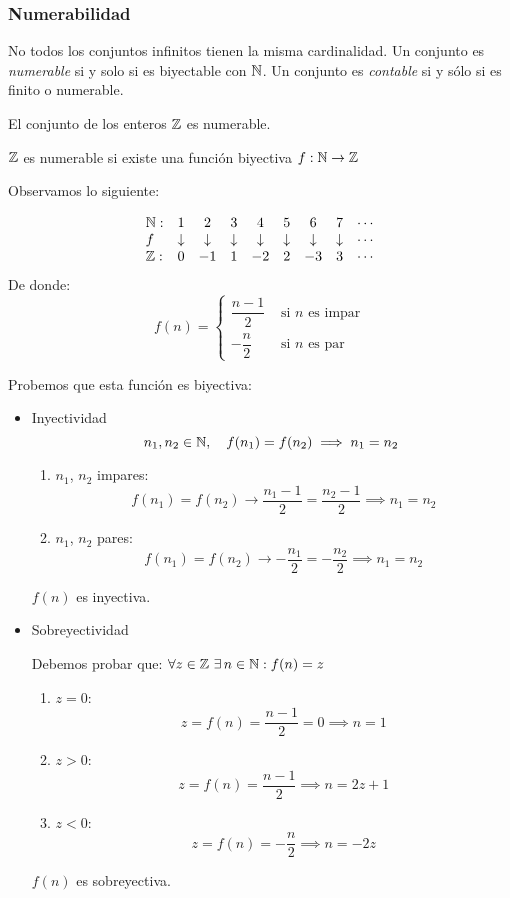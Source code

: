 \subsubsection{Numerabilidad}
No todos los conjuntos infinitos tienen la misma cardinalidad. Un conjunto es \textit{numerable} si y solo si es biyectable con $\mathbb{N}$. Un conjunto es \textit{contable} si y sólo si es finito o numerable.

\begin{fmd-theorem}[Numerabilidad de $\Z$]
	El conjunto de los enteros $\Z$ es numerable.
\end{fmd-theorem}

\begin{fmd-proof}
	$\Z$ es numerable si existe una función biyectiva $f: \mathbb{N} \rightarrow \mathbb{Z}$
	
	Observamos lo siguiente:
	
	\[ \begin{array}{lcccccccc}
		\mathbb{N}: & 1 & 2 & 3 & 4 & 5 & 6 & 7 & \cdots\\
		f & \downarrow & \downarrow & \downarrow & \downarrow & \downarrow & \downarrow & \downarrow & \cdots\\
		\mathbb{Z}: & 0 & -1 & 1 & -2 & 2 & -3 & 3 & \cdots
	\end{array} \]
	De donde:
	\[ f(n) = \begin{cases}
		\dfrac{n-1}{2} & \text{ si } n \text{ es impar}\\[3mm]
		- \dfrac{n}{2} & \text{ si } n \text{ es par}
	\end{cases} \]
	
	Probemos que esta función es biyectiva:
	
	\begin{itemize}
		\item Inyectividad
		\[ n_1, n_2 \in \mathbb{N}, \quad f(n_1) = f(n_2) \implies n_1 = n_2\]
		\begin{enumerate}[label=\arabic*)]
			\item $n_1$, $n_2$ impares:
			\[ f(n_1) = f(n_2) \rightarrow \dfrac{n_1 - 1}{2} = \dfrac{n_2 - 1}{2} \implies n_1 = n_2 \]
			\item $n_1$, $n_2$ pares:
			\[ f(n_1) = f(n_2) \rightarrow -\dfrac{n_1}{2} = -\dfrac{n_2}{2} \implies n_1 = n_2 \]
		\end{enumerate}
		$f(n)$ es inyectiva.
		
		\item Sobreyectividad
		
		Debemos probar que: \( \forall z \in \Z \ \exists \, n \in \N : f(n) = z \)
		\begin{enumerate}[label=\arabic*)]
			\item $z = 0$:
			\[ z = f(n) = \dfrac{n - 1}{2} = 0 \implies n = 1 \]
			\item $z > 0$:
			\[ z = f(n) = \dfrac{n - 1}{2} \implies n = 2z + 1 \]
			\item $z < 0$:
			\[ z = f(n) = -\dfrac{n}{2} \implies n = -2z \]
		\end{enumerate}
		$f(n)$ es sobreyectiva.
	\end{itemize}
	

\end{fmd-proof}
